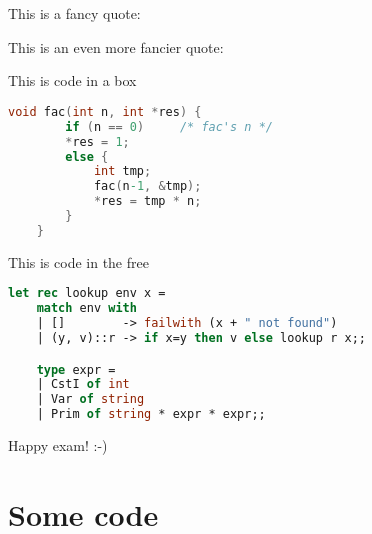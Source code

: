 \documentclass{ituhandin}
\begin{document}
%
\maketitlepage
\signpage

\chapter{}

This is a fancy quote:

This is an even more fancier quote:

This is code in a box

\begin{lstlisting}[language=C, caption=This is a caption]
    void fac(int n, int *res) {
        if (n == 0)     /* fac's n */
        *res = 1;
        else {
            int tmp;
            fac(n-1, &tmp);
            *res = tmp * n;
        }
    }
\end{lstlisting}


This is code in the free

\begin{lstlisting}[language=ML, frame={}]
    let rec lookup env x =
    match env with 
    | []        -> failwith (x + " not found")
    | (y, v)::r -> if x=y then v else lookup r x;;

    type expr = 
    | CstI of int
    | Var of string
    | Prim of string * expr * expr;;
\end{lstlisting}


Happy exam! :-)


\chapter{}
\section{}
\section{}




\styleAppendix
\appendix
\chapter{Some code}

\label{LastPage}
\end{document}
